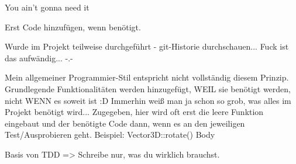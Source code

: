 



You ain't gonna need it

Erst Code hinzufügen, wenn benötigt.

Wurde im Projekt teilweise durchgeführt - git-Historie durchschauen... Fuck ist das aufwändig... -.-

Mein allgemeiner Programmier-Stil entspricht nicht vollständig diesem Prinzip.
Grundlegende Funktionalitäten werden hinzugefügt, WEIL sie benötigt werden, nicht WENN es soweit ist :D
Immerhin weiß man ja schon so grob, was alles im Projekt benötigt wird... Zugegeben, hier wird oft erst die leere Funktion eingebaut und der benötigte Code dann, wenn es an den jeweiligen Test/Ausprobieren geht.
Beispiel: Vector3D::rotate() Body

Basis von TDD => Schreibe nur, was du wirklich brauchst.